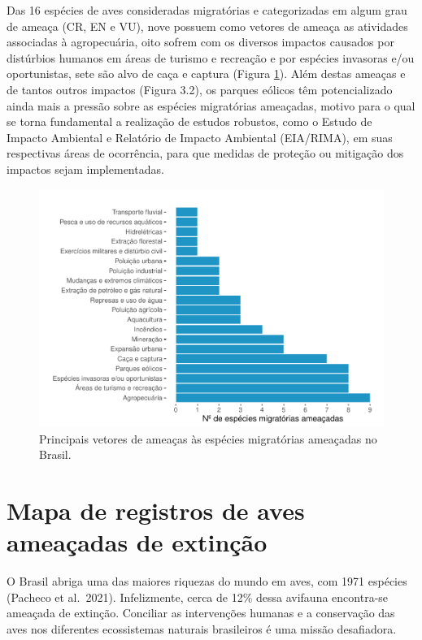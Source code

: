 \documentclass[
  oneside]{scrbook}
\begin{document}
Das 16 espécies de aves consideradas migratórias e categorizadas em algum grau de ameaça (CR, EN e VU), nove possuem como vetores de ameaça as atividades associadas à agropecuária, oito sofrem com os diversos impactos causados por distúrbios humanos em áreas de turismo e recreação e por espécies invasoras e/ou oportunistas, sete são alvo de caça e captura (Figura \ref{fig:10}). Além destas ameaças e de tantos outros impactos (Figura 3.2), os parques eólicos têm potencializado ainda mais a pressão sobre as espécies migratórias ameaçadas, motivo para o qual se torna fundamental a realização de estudos robustos, como o Estudo de Impacto Ambiental e Relatório de Impacto Ambiental (EIA/RIMA), em suas respectivas áreas de ocorrência, para que medidas de proteção ou mitigação dos impactos sejam implementadas.

\begin{figure}[H]

{\centering \includegraphics[width=0.85\linewidth]{04-cap03_files/figure-latex/10-1} 

}

\caption{Principais vetores de ameaças às espécies migratórias ameaçadas no Brasil.}\label{fig:10}
\end{figure}

\newpage

\hypertarget{mapa-de-registros-de-aves-ameauxe7adas-de-extinuxe7uxe3o}{%
\section{Mapa de registros de aves ameaçadas de extinção}\label{mapa-de-registros-de-aves-ameauxe7adas-de-extinuxe7uxe3o}}

O Brasil abriga uma das maiores riquezas do mundo em aves, com 1971 espécies (Pacheco et al.~2021). Infelizmente, cerca de 12\% dessa avifauna encontra-se ameaçada de extinção. Conciliar as intervenções humanas e a conservação das aves nos diferentes ecossistemas naturais brasileiros é uma missão desafiadora.
\end{document}

